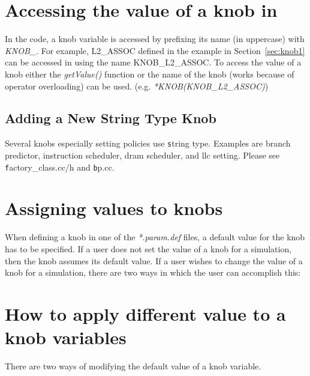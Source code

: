\section{Accessing the value of a knob in \SIM}

In the \SIM code, a knob variable is accessed by prefixing its name (in
uppercase) with \textit{KNOB\_}.  For example, L2\_ASSOC defined in the example
in Section~\ref{sec:knob1} can be accessed in \SIM using the name
KNOB\_L2\_ASSOC.  To access the value of a knob either the \textit{getValue()}
function or the name of the knob (works because of operator overloading) can be
used. (e.g. \textit{*KNOB(KNOB\_L2\_ASSOC)})

\ignore
		{ \subsection{Adding a New String Type Knob} Several knobs especially
		setting policies use {\texttt string} type.  Examples are branch predictor,
		instruction scheduler, dram scheduler, and llc setting. Please see {\texttt
		factory\_class.cc/h} and {\texttt bp.cc}.  }

\section{Assigning values to knobs}

When defining a knob in one of the \textit{*.param.def} files, a default value
for the knob has to be specified. If a user does not set the value of a knob
for a simulation, then the knob assumes its default value. If a user wishes to
change the value of a knob for a simulation, there are two ways in which the
user can accomplish this:

\ignore 
		{ \section{How to apply different value to a knob variables} There are
		two ways of modifying the default value of a knob variable.  }

